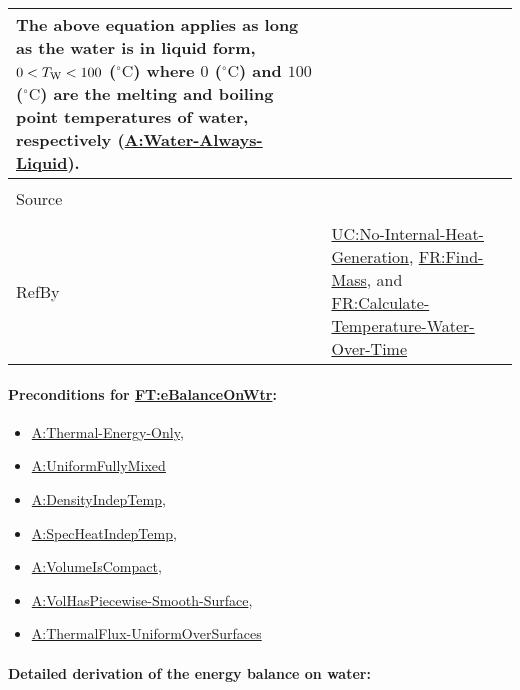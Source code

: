 \documentclass[12pt]{article}
\newcommand{\lt}{\ensuremath <}
\begin{document}
\begin{minipage}{\textwidth}
\begin{tabular}{>{\raggedright}p{}>{\raggedright\arraybackslash}p{}}
The above equation applies as long as the water is in liquid form,
$0\lt{}{T_{\text{W}}}\lt{}100$ (${{}^{\circ}\text{C}}$) where $0$
(${{}^{\circ}\text{C}}$) and $100$ (${{}^{\circ}\text{C}}$) are the melting and
boiling point temperatures of water, respectively
(\hyperref[assumpWAL]{A:Water-Always-Liquid}).
        
\\ \midrule \\
Source & \cite[(with PCM removed)]{koothoor2013}

\\ \midrule \\
RefBy & \hyperref[unlikeChgNIHG]{UC:No-Internal-Heat-Generation},
\hyperref[findMass]{FR:Find-Mass}, and
\hyperref[calcTempWtrOverTime]{FR:Calculate-Temperature-Water-Over-Time}
        
\\ \bottomrule
\end{tabular}
\end{minipage}


\paragraph{Preconditions for \hyperref[FT:eBalanceOnWtr]{FT:eBalanceOnWtr}:}
\label{FT:eBalanceOnWtrPrecond}

\begin{itemize}
\item \hyperref[assumpTEO]{A:Thermal-Energy-Only},
\item \hyperref[assumpFullyMixed]{A:UniformFullyMixed}
\item \hyperref[assumpDensIndepT]{A:DensityIndepTemp},
\item \hyperref[assumpSpecHeatIndepT]{A:SpecHeatIndepTemp},
\item \hyperref[assumpPiecewiseSmooth]{A:VolumeIsCompact},
\item \hyperref[assumpPiecewiseSmooth]{A:VolHasPiecewise-Smooth-Surface},
\item \hyperref[assumpUnifThermFlux]{A:ThermalFlux-UniformOverSurfaces}
\end{itemize}


\paragraph{Detailed derivation of the energy balance on water:}
\label{FT:eBalanceOnWtrDeriv}
\end{document}
